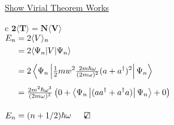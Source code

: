 \documentclass[12pt]{article}
\newcommand{\checkedbox}{\mbox{\ooalign{$\checkmark$\cr\hidewidth$\square$\hidewidth\cr}}} %
\begin{document}
\vfill \noindent
\begin{minipage}[t]{.48\textwidth}
    \setlength{\parindent}{.5cm}
    \noindent \underline{Show Virial Theorem Works}\\[15pt]
    { \setlength{\tabcolsep}{0pt}
    \begin{tabular}{c}
        \( \boldsymbol{ 2 \langle T \rangle = N \langle V \rangle } \) \\[20pt]
        \( \begin{aligned} 
            E_n &= 2 \langle V \rangle_n\\
            &= 2 \langle \Psi_n |V| \Psi_n \rangle\\[5pt]
            &= 2 \left\langle \Psi_n \left| \tfrac{1}{2}mw^2 
                \tfrac{2m \hbar \omega}{(2m \omega)^2} 
                (a + a^\dagger)^2 \right| \Psi_n \right\rangle \\[5pt]
            &= \tfrac{2m^2 \hbar \omega^3}{(2m \omega)^2} 
                \left( 0 + \left\langle \Psi_n \left| (a a^\dagger + a^\dagger a) \right| 
                \Psi_n \right\rangle + 0 \right)\\[10pt]
            E_n &= (n+1/2) \hbar \omega \indent \checkedbox
        \end{aligned} \)
    \end{tabular} }
\end{minipage}
\end{document}
